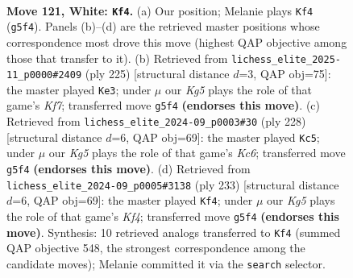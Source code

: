 \documentclass[11pt]{article}
\begin{document}
\clearpage

\begin{figure}[p]\centering
\begin{subfigure}{0.46\textwidth}\centering
\resizebox{\linewidth}{!}{%
\newchessgame
\chessboard[
  setfen={8/4k3/R7/1r4K1/6P1/8/8/4N3 w - - 25 121},
  showmover=false,
  pgfstyle=straightmove, color=movearrow, markmove={g5-f4}
]}
\caption{}
\end{subfigure}\hfill
\begin{subfigure}{0.46\textwidth}\centering
\resizebox{\linewidth}{!}{%
\newchessgame
\chessboard[
  setfen={8/8/3r4/8/8/5p2/R4k1K/8 b - - 59 113},
  showmover=false,
  pgfstyle=straightmove, color=movearrow, markmove={f2-e3}
]}
\caption{}
\end{subfigure}
\\[4pt]
\begin{subfigure}{0.46\textwidth}\centering
\resizebox{\linewidth}{!}{%
\newchessgame
\chessboard[
  setfen={k7/2P5/2K4r/8/1R6/8/8/8 w - - 39 115},
  showmover=false,
  pgfstyle=straightmove, color=movearrow, markmove={c6-c5}
]}
\caption{}
\end{subfigure}\hfill
\begin{subfigure}{0.46\textwidth}\centering
\resizebox{\linewidth}{!}{%
\newchessgame
\chessboard[
  setfen={8/8/6p1/R4k2/8/8/7r/4K3 b - - 3 117},
  showmover=false,
  pgfstyle=straightmove, color=movearrow, markmove={f5-f4}
]}
\caption{}
\end{subfigure}
\caption{\textbf{Move 121, White: \texttt{Kf4}.} (a) Our position; Melanie plays \texttt{Kf4} (\texttt{g5f4}). Panels (b)--(d) are the retrieved master positions whose correspondence most drove this move (highest QAP objective among those that transfer to it). (b) Retrieved from \texttt{lichess\_elite\_2025-11\_p0000\#2409} (ply 225) [structural distance $d$=3, QAP obj=75]: the master played \texttt{Ke3}; under $\mu$ our \emph{Kg5} plays the role of that game's \emph{Kf7}; transferred move \texttt{g5f4} \textbf{(endorses this move)}. (c) Retrieved from \texttt{lichess\_elite\_2024-09\_p0003\#30} (ply 228) [structural distance $d$=6, QAP obj=69]: the master played \texttt{Kc5}; under $\mu$ our \emph{Kg5} plays the role of that game's \emph{Kc6}; transferred move \texttt{g5f4} \textbf{(endorses this move)}. (d) Retrieved from \texttt{lichess\_elite\_2024-09\_p0005\#3138} (ply 233) [structural distance $d$=6, QAP obj=69]: the master played \texttt{Kf4}; under $\mu$ our \emph{Kg5} plays the role of that game's \emph{Kf4}; transferred move \texttt{g5f4} \textbf{(endorses this move)}. Synthesis: 10 retrieved analogs transferred to \texttt{Kf4} (summed QAP objective 548, the strongest correspondence among the candidate moves); Melanie committed it via the \texttt{search} selector.}
\label{fig:thought-m240}
\end{figure}
\end{document}
